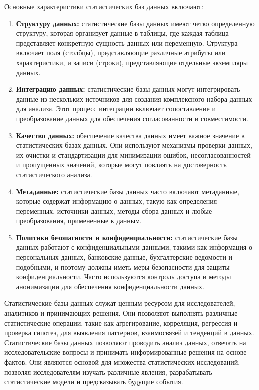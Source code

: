 Основные характеристики статистических баз данных включают:
\begin{enumerate}
    \item \textbf{Структуру данных:} статистические базы данных имеют четко определенную структуру, которая организует данные в таблицы, где каждая таблица представляет конкретную сущность данных или переменную. Структура включает поля (столбцы), представляющие различные атрибуты или характеристики, и записи (строки), представляющие отдельные экземпляры данных.
    \item \textbf{Интеграцию данных:} статистические базы данных могут интегрировать данные из нескольких источников для создания комплексного набора данных для анализа. Этот процесс интеграции включает сопоставление и преобразование данных для обеспечения согласованности и совместимости.
    \item \textbf{Качество данных:} обеспечение качества данных имеет важное значение в статистических базах данных. Они используют механизмы проверки данных, их очистки и стандартизации для минимизации ошибок, несогласованностей и пропущенных значений, которые могут повлиять на достоверность статистического анализа.
    \item \textbf{Метаданные:} статистические базы данных часто включают метаданные, которые содержат информацию о данных, такую как определения переменных, источники данных, методы сбора данных и любые преобразования, примененные к данным.
    \item \textbf{Политики безопасности и конфиденциальности:} статистические базы данных работают с конфиденциальными данными, такими как информация о персональных данных, банковские данные, бухгалтерские ведомости и подобными, и поэтому должны иметь меры безопасности для защиты конфиденциальности. Часто используются контроль доступа и методы анонимизации для обеспечения конфиденциальности данных.
\end{enumerate}


Статистические базы данных служат ценным ресурсом для исследователей, аналитиков и принимающих решения. Они позволяют выполнять различные статистические операции, такие как агрегирование, корреляция, регрессия и проверка гипотез, для выявления паттернов, взаимосвязей и тенденций в данных.
\\

Статистические базы данных позволяют проводить анализ данных, отвечать на исследовательские вопросы и принимать информированные решения на основе фактов. Они являются основой для множества статистических исследований, позволяя исследователям изучать различные явления, разрабатывать статистические модели и предсказывать будущие события.
\\

